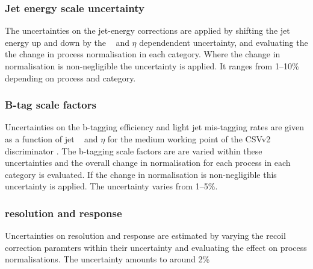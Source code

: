 \subsubsection*{Jet energy scale uncertainty}
The uncertainties on the jet-energy corrections are applied
by shifting the jet energy up and down by the \pT~ and $\eta$ dependendent
uncertainty, and evaluating the the change in process normalisation in
each category. Where the change in normalisation is non-negligible the
uncertainty is applied. It ranges from 1--10\% depending on process and category.
\subsubsection*{B-tag scale factors}
Uncertainties on the b-tagging efficiency and light jet mis-tagging
rates are given as a function of jet \pT~ and $\eta$ for the 
medium working point of the \ac{CSV}v2 discriminator \cite{cms-btag-run2}.
The b-tagging scale factors are are varied within these uncertainties
and the overall change in normalisation for each process in each category is
evaluated. If the change in normalisation is non-negligible this
uncertainty is applied. The uncertainty varies from 1--5\%.
\subsubsection*{\MET resolution and response}
Uncertainties on \MET resolution and response are estimated
by varying the recoil correction paramters within their
uncertainty and evaluating the effect on process
normalisations. The uncertainty amounts to around 2\%
